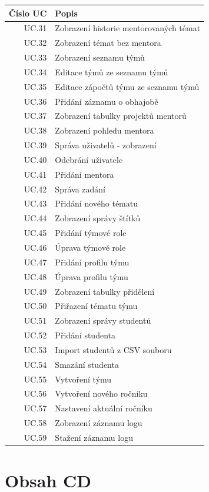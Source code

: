 \documentclass[czech,BP]{thesiskiv}
\begin{document}
{\begin{table}[]
\end{table}
\begin{table}
	\begin{xltabular}{\textwidth}{|r|X|}\hline
		Číslo UC & Popis\\\hline\hline
		UC.31	& Zobrazení historie mentorovaných témat\\\hline
		UC.32	& Zobrazení témat bez mentora\\\hline
		UC.33	& Zobrazení seznamu týmů\\\hline
		UC.34	& Editace týmů ze seznamu týmů\\\hline
		UC.35	& Editace zápočtů týmu ze seznamu týmů\\\hline
		UC.36	& Přidání záznamu o obhajobě\\\hline
		UC.37	& Zobrazení tabulky projektů mentorů\\\hline
		UC.38	& Zobrazení pohledu mentora\\\hline
		UC.39	& Správa uživatelů - zobrazení\\\hline
		UC.40	& Odebrání uživatele\\\hline
		UC.41	& Přidání mentora\\\hline
		UC.42	& Správa zadání\\\hline
		UC.43	& Přidání nového tématu\\\hline
		UC.44	& Zobrazení správy štítků\\\hline
		UC.45	& Přidání týmové role\\\hline
		UC.46	& Úprava týmové role\\\hline
		UC.47	& Přidání profilu týmu\\\hline
		UC.48	& Úprava profilu týmu\\\hline
		UC.49	& Zobrazení tabulky přidělení\\\hline
		UC.50	& Přiřazení tématu týmu\\\hline
		UC.51	& Zobrazení správy studentů\\\hline
		UC.52	& Přidání studenta\\\hline
		UC.53	& Import studentů z CSV souboru\\\hline
		UC.54	& Smazání studenta\\\hline
		UC.55	& Vytvoření týmu\\\hline
		UC.56	& Vytvoření nového ročníku\\\hline
		UC.57	& Nastavení aktuální ročníku\\\hline
		UC.58	& Zobrazení záznamu logu\\\hline
		UC.59	& Stažení záznamu logu\\\hline
		
	\end{xltabular}
\end{table}
\chapter{Obsah CD}
}
\end{document}
